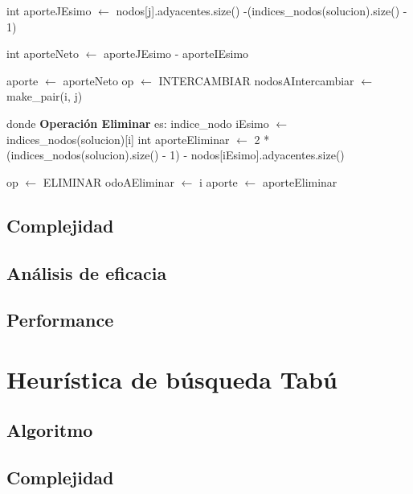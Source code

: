 \documentclass[a4paper, 10pt, twoside]{article}
\newenvironment{pseudo}[1][]{%
    \vspace{1em}%
    \begin{algorithmic}%
}
{%
    \end{algorithmic}%
    \vspace{1em}%
}
\begin{document}
\begin{pseudo}
					\State int aporteJEsimo $\leftarrow$ nodos[j].adyacentes.size() -(indices\_nodos(solucion).size() - 1)

					\State int aporteNeto $\leftarrow$ aporteJEsimo - aporteIEsimo

						\State aporte $\leftarrow$ aporteNeto
						\State op $\leftarrow$ INTERCAMBIAR
						\State nodosAIntercambiar $\leftarrow$ make\_pair(i, j)
					\EndIf
				\EndIf
			\EndFor		

\State
\State donde \textbf{Operación Eliminar} es:
\State
			\State indice\_nodo iEsimo $\leftarrow$ indices\_nodos(solucion)[i]
			\State int aporteEliminar $\leftarrow$ 2 * (indices\_nodos(solucion).size() - 1) - nodos[iEsimo].adyacentes.size()

				\State op $\leftarrow$ ELIMINAR
				\State odoAEliminar $\leftarrow$ i
				\State aporte $\leftarrow$ aporteEliminar
			\EndIf
		\EndFor


\end{pseudo}

\subsection{Complejidad}
\subsection{Análisis de eficacia}
\subsection{Performance}



\newpage

\section{Heurística de búsqueda Tabú}
\subsection{Algoritmo}
\subsection{Complejidad}
\end{document}
